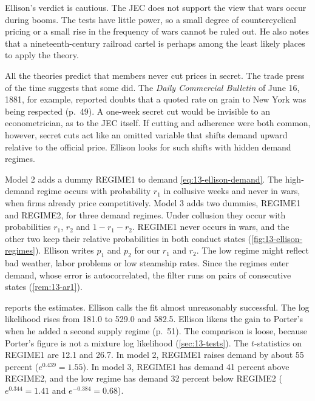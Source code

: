 Ellison's verdict is cautious. The JEC does not support the view that wars occur during booms. The tests have little
power, so a small degree of countercyclical pricing or a small rise in the frequency of wars cannot be ruled out. He
also notes that a nineteenth-century railroad cartel is perhaps among the least likely places to apply the theory.

All the theories predict that members never cut prices in secret. The trade press of the time suggests that some did.
The \textit{Daily Commercial Bulletin} of June 16, 1881, for example, reported doubts that a quoted rate on grain to
New York was being respected (p.~49). A one-week secret cut would be invisible to an econometrician, as to the
JEC itself. If cutting and adherence were both common, however, secret cuts act like an omitted variable that shifts
demand upward relative to the official price. Ellison looks for such shifts with hidden demand regimes.

Model 2 adds a dummy REGIME1 to demand \eqref{eq:13-ellison-demand}. The high-demand regime occurs with probability
$r_1$ in collusive weeks and never in wars, when firms already price competitively. Model 3 adds two dummies, REGIME1
and REGIME2, for three demand regimes. Under collusion they occur with probabilities $r_1$, $r_2$ and $1 - r_1 - r_2$.
REGIME1 never occurs in wars, and the other two keep their relative probabilities in both conduct states
(\cref{fig:13-ellison-regimes}). Ellison writes $p_1$ and $p_2$ for our $r_1$ and $r_2$. The low regime might reflect
bad weather, labor problems or low steamship rates. Since the regimes enter demand, whose error is autocorrelated, the
filter runs on pairs of consecutive states (\cref{rem:13-ar1}).

 reports the estimates. Ellison calls the fit almost unreasonably successful. The log
likelihood rises from 181.0 to 529.0 and 582.5. Ellison likens the gain to Porter's when he added a second supply
regime (p.~51). The comparison is loose, because Porter's figure is not a mixture log likelihood
(\cref{sec:13-tests}). The $t$-statistics on REGIME1 are 12.1 and 26.7. In model 2, REGIME1 raises demand by about 55 percent
($e^{0.439} = 1.55$). In model 3, REGIME1 has demand 41 percent above REGIME2, and the low regime has demand 32 percent
below REGIME2 ($e^{0.344} = 1.41$ and $e^{-0.384} = 0.68$).

